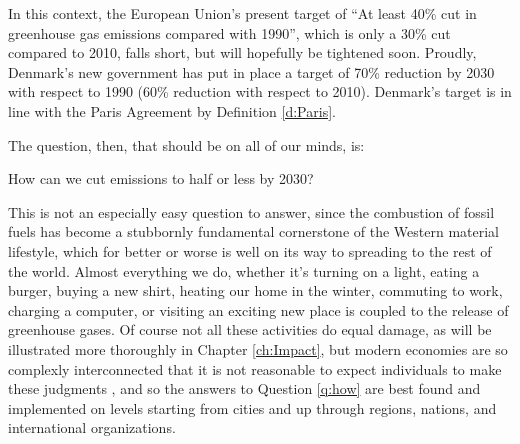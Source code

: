 In this context, the European Union's present target of ``At least 40\% cut in greenhouse gas emissions compared with 1990''\cite{EC_2030}, which is only a 30\% cut compared to 2010\cite{Ritchie2019a}, falls short, but will hopefully be tightened soon. Proudly, Denmark's new government has put in place a target of 70\% reduction by 2030 with respect to 1990 (60\% reduction with respect to 2010)\cite{CHN_70p}. Denmark's target is in line with the Paris Agreement by Definition \ref{d:Paris}. 



The question, then, that should be on all of our minds, is:

\begin{question}
How can we cut emissions to half or less by 2030? \label{q:how}
\end{question}

This is not an especially easy question to answer, since the combustion of fossil fuels has become a stubbornly fundamental cornerstone of the Western material lifestyle, which for better or worse is well on its way to spreading to the rest of the world. Almost everything we do, whether it's turning on a light, eating a burger, buying a new shirt, heating our home in the winter, commuting to work, charging a computer, or visiting an exciting new place is coupled to the release of greenhouse gases. Of course not all these activities do equal damage, as will be illustrated more thoroughly in Chapter \ref{ch:Impact}, but modern economies are so complexly interconnected that it is not reasonable to expect individuals to make these judgments
, and so
the answers to Question \ref{q:how} are best found and implemented on levels starting from cities and up through regions, nations, and international organizations.

